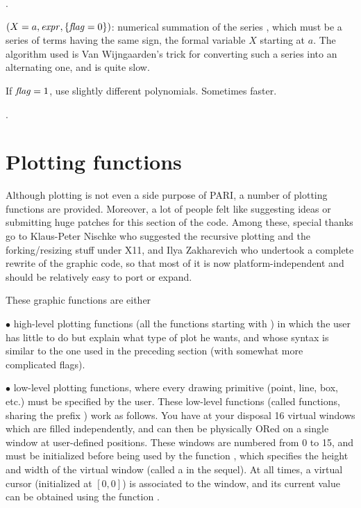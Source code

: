 .

$(X=a,\hbox{\it expr\/},\{\hbox{\it f\kern0pt lag\/}=0\})$: numerical summation of the
series , which must be a series of terms having the same sign,
the formal
variable $X$ starting at $a$. The algorithm used is Van Wijngaarden's trick
for converting such a series into an alternating one, and is quite slow.

If $\hbox{\it f\kern0pt lag\/}=1$, use slightly different polynomials. Sometimes faster.

.

\section{Plotting functions}

  Although plotting is not even a side purpose of PARI, a number of plotting
functions are provided. Moreover, a lot of people felt like suggesting
ideas or submitting huge patches for this section of the code. Among these,
special thanks go to Klaus-Peter Nischke who suggested the recursive plotting
and the forking/resizing stuff under X11, and Ilya Zakharevich who
undertook a complete rewrite of the graphic code, so that most of it is now
platform-independent and should be relatively easy to port or expand.

These graphic functions are either

$\bullet$ high-level plotting functions (all the functions starting with
) in which the user has little to do but explain what type of plot
he wants, and whose syntax is similar to the one used in the preceding
section (with somewhat more complicated flags).

$\bullet$ low-level plotting functions, where every drawing primitive (point,
line, box, etc.) must be specified by the user. These low-level functions
(called  functions, sharing the prefix ) work as
follows. You have at your disposal 16 virtual windows which are filled
independently, and can then be physically ORed on a single window at
user-defined positions. These windows are numbered from 0 to 15, and must be
initialized before being used by the function , which specifies
the height and width of the virtual window (called a  in the
sequel). At all times, a virtual cursor (initialized at $[0,0]$) is
associated to the window, and its current value can be obtained using the
function .

